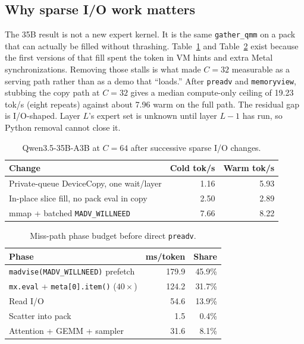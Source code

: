 \subsection{Why sparse I/O work matters}
\label{sec:eval-io}

The 35B result is not a new expert kernel. It is the same \texttt{gather\_qmm} on a pack that can actually be filled without thrashing. Table~\ref{tab:io} and Table~\ref{tab:phase} exist because the first versions of that fill spent the token in VM hints and extra Metal synchronizations. Removing those stalls is what made $C{=}32$ measurable as a serving path rather than as a demo that ``loads.'' After \texttt{preadv} and \texttt{memoryview}, stubbing the copy path at $C{=}32$ gives a median compute-only ceiling of 19.23 tok/s (eight repeats) against about 7.96 warm on the full path. The residual gap is I/O-shaped. Layer $L$’s expert set is unknown until layer $L{-}1$ has run, so Python removal cannot close it.

\begin{table}[t]
\centering
\caption{Qwen3.5-35B-A3B at $C{=}64$ after successive sparse I/O changes.}
\label{tab:io}
\small
\begin{tabular}{@{}lrr@{}}
\toprule
Change & Cold tok/s & Warm tok/s \\
\midrule
Private-queue DeviceCopy, one wait/layer & 1.16 & 5.93 \\
In-place slice fill, no pack eval in copy & 2.50 & 2.89 \\
mmap + batched \texttt{MADV\_WILLNEED} & 7.66 & 8.22 \\
\bottomrule
\end{tabular}
\end{table}

\begin{table}[t]
\centering
\caption{Miss-path phase budget before direct \texttt{preadv}.}
\label{tab:phase}
\small
\begin{tabular}{@{}lrr@{}}
\toprule
Phase & ms/token & Share \\
\midrule
\texttt{madvise(MADV\_WILLNEED)} prefetch & 179.9 & 45.9\% \\
\texttt{mx.eval} + \texttt{meta[0].item()} ($40{\times}$) & 124.2 & 31.7\% \\
Read I/O & 54.6 & 13.9\% \\
Scatter into pack & 1.5 & 0.4\% \\
Attention + GEMM + sampler & 31.6 & 8.1\% \\
\bottomrule
\end{tabular}
\end{table}

